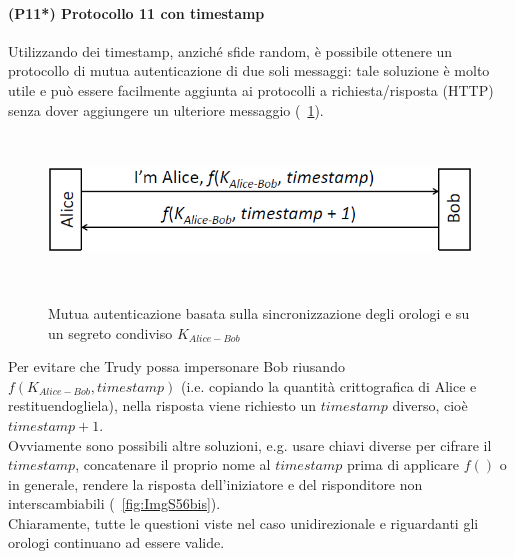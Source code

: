 \paragraph{(P11*) Protocollo 11 con timestamp}
Utilizzando dei timestamp, anziché sfide random, è possibile ottenere un protocollo di mutua autenticazione di due soli messaggi: tale soluzione è molto utile e può essere facilmente aggiunta ai protocolli a richiesta/risposta (HTTP) senza dover aggiungere un ulteriore messaggio (\figurename~\ref{fig:ImgS53bis}).
\begin{figure}[htbp]
	\centering%
	\subfigure%
	{\includegraphics[height=4cm, width=12cm, keepaspectratio]{Immagini/autenticazione/ImgS53bis.png}}
	\caption{Mutua autenticazione basata sulla sincronizzazione degli orologi e su un segreto condiviso $K_{Alice-Bob}$}\label{fig:ImgS53bis} 	
\end{figure}
Per evitare che Trudy possa impersonare Bob riusando $f(K_{Alice-Bob}, timestamp)$ (i.e. copiando la quantità crittografica di Alice e restituendogliela), nella risposta viene richiesto un $timestamp$ diverso, cioè $timestamp + 1$.\\
Ovviamente sono possibili altre soluzioni, e.g. usare chiavi diverse per cifrare il $timestamp$, concatenare il proprio nome al $timestamp$ prima di applicare $f()$ o in generale, rendere la risposta dell'iniziatore e del
risponditore non interscambiabili (\figurename~\ref{fig:ImgS56bis}).\\
Chiaramente, tutte le questioni viste nel caso unidirezionale e riguardanti gli orologi continuano ad essere valide. 
